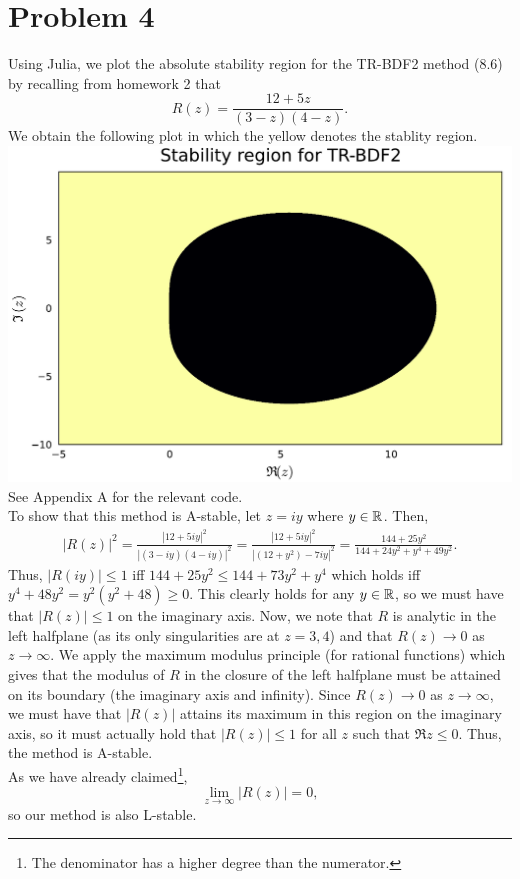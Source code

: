 \documentclass{article}
\begin{document}
\section{Problem 4}
Using Julia, we plot the absolute stability region for the TR-BDF2 method (8.6) by recalling from homework 2 that 
\[
R(z)=\frac{12+5z}{(3-z)(4-z)}.
\]
We obtain the following plot in which the yellow denotes the stablity region. \\
\includegraphics[scale=0.5]{trbdf.pdf}\\
See Appendix A for the relevant code. \\
To show that this method is A-stable, let $z=iy$ where $y\in\mathbb{R}$. Then,
\begin{align*}
|R(z)|^2=\frac{|12+5iy|^2}{|(3-iy)(4-iy)|^2}=\frac{|12+5iy|^2}{|(12+y^2)-7iy|^2}=\frac{144+25y^2}{144+24y^2+y^4+49y^2}.
\end{align*}
Thus, $|R(iy)|\leq1$ iff $144+25y^2\leq144+73y^2+y^4$ which holds iff $y^4+48y^2=y^2(y^2+48)\geq0$. This clearly holds for any $y\in\mathbb{R}$, so we must have that $|R(z)|\leq1$ on the imaginary axis. Now, we note that $R$ is analytic in the left halfplane (as its only singularities are at $z=3,4$) and that $R(z)\to0$ as $z\to\infty$. We apply the maximum modulus principle (for rational functions) which gives that the modulus of $R$ in the closure of the left halfplane must be attained on its boundary (the imaginary axis and infinity). Since $R(z)\to0$ as $z\to\infty$, we must have that $|R(z)|$ attains its maximum in this region on the imaginary axis, so it must actually hold that $|R(z)|\leq1$ for all $z$ such that $\Re z\leq0$. Thus, the method is A-stable. \\
As we have already claimed\footnote{The denominator has a higher degree than the numerator.},
\[
\lim_{z\to\infty}|R(z)|=0,
\]
so our method is also L-stable.
\end{document}
